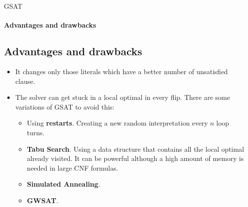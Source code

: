 \documentclass{beamer}
\begin{document}
\begin{frame}{GSAT}
\framesubtitle{Advantages and drawbacks}
\subsection{Advantages and drawbacks}
\begin{itemize}
	\item It changes only those literals which have a better number of unsatisfied clause. 
	\item The solver can get stuck in a local optimal in every flip. There are some variations of GSAT to avoid this:
	\begin{itemize}
		\item Using \textbf{restarts}. Creating a new random interpretation every $n$ loop turns.
		\item \textbf{Tabu Search}. Using a data structure that contains all the local optimal already visited. It can be powerful although a high amount of memory is needed in large CNF formulas.
		\item \textbf{Simulated Annealing}.
		\item \textbf{GWSAT}.
		
	\end{itemize}
\end{itemize}
\end{frame}
\end{document}
